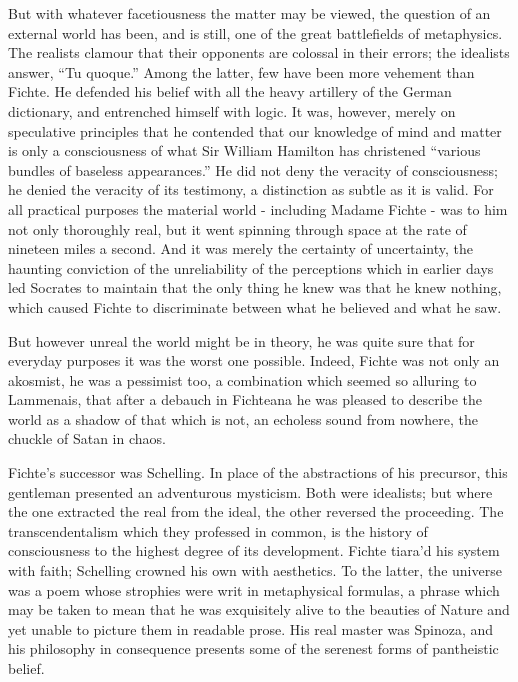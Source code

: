 \documentclass[]{book}
\begin{document}
But with whatever facetiousness the matter may be viewed, the question
of an external world has been, and is still, one of the great
battlefields of metaphysics. The realists clamour that their opponents
are colossal in their errors; the idealists answer, ``Tu quoque.'' Among
the latter, few have been more vehement than Fichte. He defended his
belief with all the heavy artillery of the German dictionary, and
entrenched himself with logic. It was, however, merely on speculative
principles that he contended that our knowledge of mind and matter is
only a consciousness of what Sir William Hamilton has christened
``various bundles of baseless appearances.'' He did not deny the
veracity of consciousness; he denied the veracity of its testimony, a
distinction as subtle as it is valid. For all practical purposes the
material world - including Madame Fichte - was to him not only
thoroughly real, but it went spinning through space at the rate of
nineteen miles a second. And it was merely the certainty of uncertainty,
the haunting conviction of the unreliability of the perceptions which in
earlier days led Socrates to maintain that the only thing he knew was
that he knew nothing, which caused Fichte to discriminate between what
he believed and what he saw.

But however unreal the world might be in theory, he was quite sure that
for everyday purposes it was the worst one possible. Indeed, Fichte was
not only an akosmist, he was a pessimist too, a combination which seemed
so alluring to Lammenais, that after a debauch in Fichteana he was
pleased to describe the world as a shadow of that which is not, an
echoless sound from nowhere, the chuckle of Satan in chaos.

Fichte's successor was Schelling. In place of the abstractions of his
precursor, this gentleman presented an adventurous mysticism. Both were
idealists; but where the one extracted the real from the ideal, the
other reversed the proceeding. The transcendentalism which they
professed in common, is the history of consciousness to the highest
degree of its development. Fichte tiara'd his system with faith;
Schelling crowned his own with aesthetics. To the latter, the universe
was a poem whose strophies were writ in metaphysical formulas, a phrase
which may be taken to mean that he was exquisitely alive to the beauties
of Nature and yet unable to picture them in readable prose. His real
master was Spinoza, and his philosophy in consequence presents some of
the serenest forms of pantheistic belief.
\end{document}

